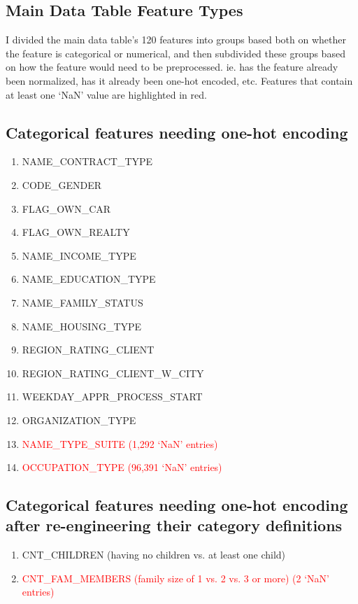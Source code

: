 \documentclass[12pt, letterpaper]{article}
\begin{document}
\begin{appendices}
\section{Main Data Table Feature Types}
\label{appendix:maindatatablefeaturetypes}
I divided the main data table's 120 features into groups based both on whether the feature is categorical or numerical, and then subdivided these groups based on how the feature would need to be preprocessed. ie. has the feature already been normalized, has it already been one-hot encoded, etc. Features that contain at least one `NaN' value are highlighted in red.

\subsection{Categorical features needing one-hot encoding}
\label{catfeatneedonehotencoding}
\footnotesize
\begin{enumerate}
  \item NAME_CONTRACT_TYPE
  \item CODE_GENDER
  \item FLAG_OWN_CAR
  \item FLAG_OWN_REALTY
  \item NAME_INCOME_TYPE
  \item NAME_EDUCATION_TYPE
  \item NAME_FAMILY_STATUS
  \item NAME_HOUSING_TYPE
  \item REGION_RATING_CLIENT
  \item REGION_RATING_CLIENT_W_CITY
  \item WEEKDAY_APPR_PROCESS_START
  \item ORGANIZATION_TYPE
  \item \textcolor{red}{NAME_TYPE_SUITE (1,292 `NaN' entries)}
  \item \textcolor{red}{OCCUPATION_TYPE (96,391 `NaN' entries)}
\end{enumerate}
\normalsize

\subsection{Categorical features needing one-hot encoding after re-engineering their category definitions}
\label{catfeatneedreengineering}
\footnotesize
\begin{enumerate}
 \item CNT_CHILDREN (having no children vs. at least one child)
 \item \textcolor{red}{CNT_FAM_MEMBERS (family size of 1 vs. 2 vs. 3 or more) (2 `NaN' entries)}
\end{enumerate}
\normalsize


\end{appendices}
\end{document}
